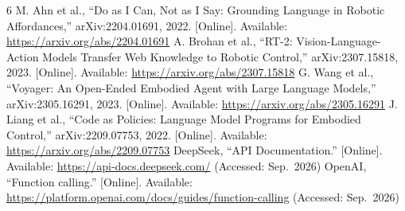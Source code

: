 \documentclass[conference]{IEEEtran}
\begin{document}
\begin{thebibliography}{6}
 M. Ahn et al., ``Do as I Can, Not as I Say: Grounding
Language in Robotic Affordances,'' arXiv:2204.01691, 2022. [Online].
Available: \url{https://arxiv.org/abs/2204.01691}
 A. Brohan et al., ``RT-2: Vision-Language-Action Models Transfer
Web Knowledge to Robotic Control,'' arXiv:2307.15818, 2023. [Online].
Available: \url{https://arxiv.org/abs/2307.15818}
 G. Wang et al., ``Voyager: An Open-Ended Embodied Agent with
Large Language Models,'' arXiv:2305.16291, 2023. [Online]. Available:
\url{https://arxiv.org/abs/2305.16291}
 J. Liang et al., ``Code as Policies: Language Model Programs for
Embodied Control,'' arXiv:2209.07753, 2022. [Online]. Available:
\url{https://arxiv.org/abs/2209.07753}
 DeepSeek, ``API Documentation.'' [Online]. Available:
\url{https://api-docs.deepseek.com/} (Accessed: Sep.\ 2026)
 OpenAI, ``Function calling.'' [Online]. Available:
\url{https://platform.openai.com/docs/guides/function-calling}
(Accessed: Sep.\ 2026)
\end{thebibliography}
\end{document}
